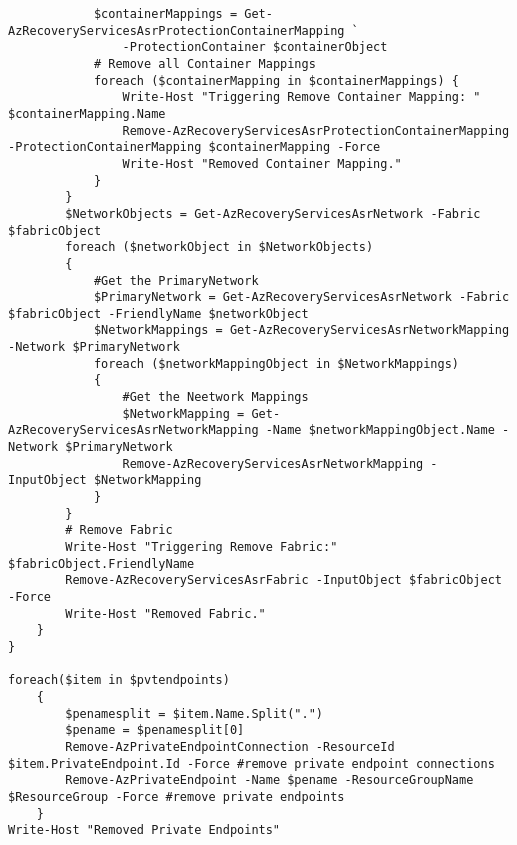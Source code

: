\begin{verbatim}
			$containerMappings = Get-AzRecoveryServicesAsrProtectionContainerMapping `
				-ProtectionContainer $containerObject
			# Remove all Container Mappings
			foreach ($containerMapping in $containerMappings) {
				Write-Host "Triggering Remove Container Mapping: " $containerMapping.Name
				Remove-AzRecoveryServicesAsrProtectionContainerMapping -ProtectionContainerMapping $containerMapping -Force
				Write-Host "Removed Container Mapping."
			}
		}
		$NetworkObjects = Get-AzRecoveryServicesAsrNetwork -Fabric $fabricObject
		foreach ($networkObject in $NetworkObjects)
		{
			#Get the PrimaryNetwork
			$PrimaryNetwork = Get-AzRecoveryServicesAsrNetwork -Fabric $fabricObject -FriendlyName $networkObject
			$NetworkMappings = Get-AzRecoveryServicesAsrNetworkMapping -Network $PrimaryNetwork
			foreach ($networkMappingObject in $NetworkMappings)
			{
				#Get the Neetwork Mappings
				$NetworkMapping = Get-AzRecoveryServicesAsrNetworkMapping -Name $networkMappingObject.Name -Network $PrimaryNetwork
				Remove-AzRecoveryServicesAsrNetworkMapping -InputObject $NetworkMapping
			}
		}
		# Remove Fabric
		Write-Host "Triggering Remove Fabric:" $fabricObject.FriendlyName
		Remove-AzRecoveryServicesAsrFabric -InputObject $fabricObject -Force
		Write-Host "Removed Fabric."
	}
}

foreach($item in $pvtendpoints)
	{
		$penamesplit = $item.Name.Split(".")
		$pename = $penamesplit[0]
		Remove-AzPrivateEndpointConnection -ResourceId $item.PrivateEndpoint.Id -Force #remove private endpoint connections
		Remove-AzPrivateEndpoint -Name $pename -ResourceGroupName $ResourceGroup -Force #remove private endpoints
	}
Write-Host "Removed Private Endpoints"


\end{verbatim}
